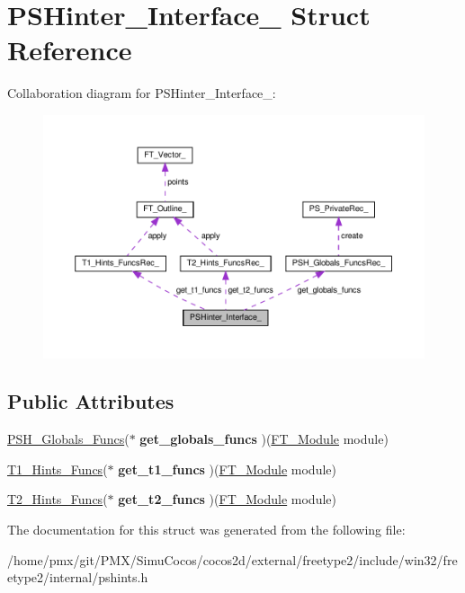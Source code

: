 \hypertarget{structPSHinter__Interface__}{}\section{P\+S\+Hinter\+\_\+\+Interface\+\_\+ Struct Reference}
\label{structPSHinter__Interface__}


Collaboration diagram for P\+S\+Hinter\+\_\+\+Interface\+\_\+\+:
\nopagebreak
\begin{figure}[H]
\begin{center}
\leavevmode
\includegraphics[width=350pt]{structPSHinter__Interface____coll__graph}
\end{center}
\end{figure}
\subsection*{Public Attributes}
\begin{DoxyCompactItemize}
\item 
\mbox{\label{structPSHinter__Interface___a59c68da021c7c0fadcb8bcc8c9a5ba75}} 
\hyperlink{structPSH__Globals__FuncsRec__}{P\+S\+H\+\_\+\+Globals\+\_\+\+Funcs}($\ast$ {\bfseries get\+\_\+globals\+\_\+funcs} )(\hyperlink{structFT__ModuleRec__}{F\+T\+\_\+\+Module} module)
\item 
\mbox{\label{structPSHinter__Interface___a9b5405d780efc53df42c3a3e4f8e844b}} 
\hyperlink{structT1__Hints__FuncsRec__}{T1\+\_\+\+Hints\+\_\+\+Funcs}($\ast$ {\bfseries get\+\_\+t1\+\_\+funcs} )(\hyperlink{structFT__ModuleRec__}{F\+T\+\_\+\+Module} module)
\item 
\mbox{\label{structPSHinter__Interface___a7ecbd2179450d996111ec51e8d50ecc3}} 
\hyperlink{structT2__Hints__FuncsRec__}{T2\+\_\+\+Hints\+\_\+\+Funcs}($\ast$ {\bfseries get\+\_\+t2\+\_\+funcs} )(\hyperlink{structFT__ModuleRec__}{F\+T\+\_\+\+Module} module)
\end{DoxyCompactItemize}


The documentation for this struct was generated from the following file\+:\begin{DoxyCompactItemize}
\item 
/home/pmx/git/\+P\+M\+X/\+Simu\+Cocos/cocos2d/external/freetype2/include/win32/freetype2/internal/pshints.\+h\end{DoxyCompactItemize}
